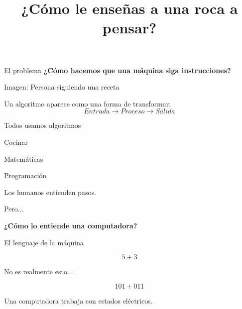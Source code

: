 \documentclass{beamer}
\title{¿Cómo le enseñas a una roca a pensar?}
\author{ }
\date{}
\begin{document}
\begin{frame}
\titlepage
\end{frame}



\begin{frame}{El problema}
\textbf{¿Cómo hacemos que una máquina siga instrucciones?}

\vspace{1cm}

\begin{center}
Imagen:
Persona siguiendo una receta
\end{center}

\pause

Un algoritmo aparece como una forma de transformar:
\[
Entrada \rightarrow Proceso \rightarrow Salida
\]

\end{frame}



\begin{frame}{Todos usamos algoritmos}
\begin{center}

Cocinar

\vspace{0.5cm}

Matemáticas

\vspace{0.5cm}

Programación

\end{center}

\pause

Los humanos entienden pasos.

Pero...

\textbf{¿Cómo lo entiende una computadora?}

\end{frame}



\begin{frame}{El lenguaje de la máquina}

\begin{center}

\[
5+3
\]

\pause

No es realmente esto...

\pause

\[
101+011
\]

\end{center}

\pause

Una computadora trabaja con estados eléctricos.

\end{frame}
\end{document}
